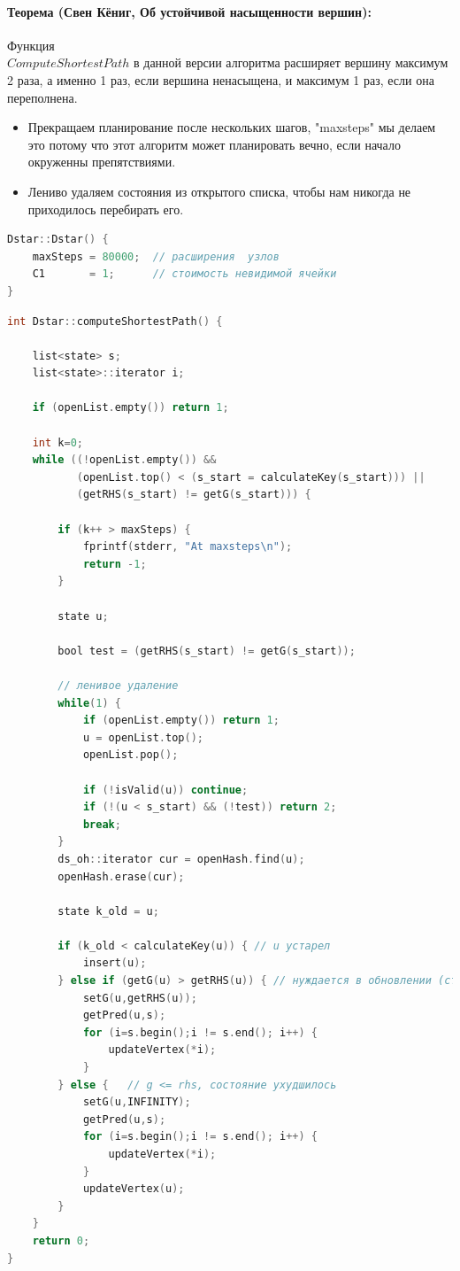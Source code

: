 \documentclass[12pt]{article}
\begin{document}
\paragraph{Теорема (Свен Кёниг, Об устойчивой насыщенности вершин):}Функция\\ $ComputeShortestPath$ в данной версии алгоритма расширяет вершину максимум 2 раза, а именно 1 раз, если вершина ненасыщена, и максимум 1 раз, если она переполнена.
\begin{itemize}
\item Прекращаем планирование после нескольких шагов, "maxsteps" мы делаем это
потому что этот алгоритм может планировать вечно, если начало
окруженны препятствиями.
\item Лениво удаляем состояния из открытого списка, чтобы нам никогда не приходилось перебирать его.
\end{itemize}
\begin{lstlisting}[language=C,style=C]
Dstar::Dstar() {
    maxSteps = 80000;  // расширения  узлов
    C1       = 1;      // стоимость невидимой ячейки
}
\end{lstlisting}
\begin{lstlisting}[language=C,style=C]
int Dstar::computeShortestPath() {

    list<state> s;
    list<state>::iterator i;

    if (openList.empty()) return 1;

    int k=0;
    while ((!openList.empty()) &&
           (openList.top() < (s_start = calculateKey(s_start))) ||
           (getRHS(s_start) != getG(s_start))) {

        if (k++ > maxSteps) {
            fprintf(stderr, "At maxsteps\n");
            return -1;
        }

        state u;

        bool test = (getRHS(s_start) != getG(s_start));

        // ленивое удаление
        while(1) {
            if (openList.empty()) return 1;
            u = openList.top();
            openList.pop();

            if (!isValid(u)) continue;
            if (!(u < s_start) && (!test)) return 2;
            break;
        }
        ds_oh::iterator cur = openHash.find(u);
        openHash.erase(cur);

        state k_old = u;

        if (k_old < calculateKey(u)) { // u устарел
            insert(u);
        } else if (getG(u) > getRHS(u)) { // нуждается в обновлении (стало лучше)
            setG(u,getRHS(u));
            getPred(u,s);
            for (i=s.begin();i != s.end(); i++) {
                updateVertex(*i);
            }
        } else {   // g <= rhs, состояние ухудшилось
            setG(u,INFINITY);
            getPred(u,s);
            for (i=s.begin();i != s.end(); i++) {
                updateVertex(*i);
            }
            updateVertex(u);
        }
    }
    return 0;
}
\end{lstlisting}
\end{document}
